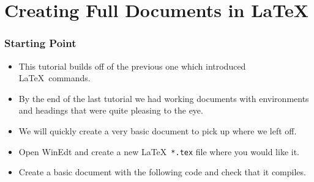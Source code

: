 \part{Creating Full Documents in \LaTeX}
\section{Starting Point}
\begin{itemize}
\item This tutorial builds off of the previous one which introduced
  \LaTeX~commands.
\item By the end of the last tutorial we had working documents with
  environments and headings that were quite pleasing to the eye.
\item We will quickly create a very basic document to pick up where we
  left off.
\item Open WinEdt and create a new \LaTeX~\texttt{*.tex} file where
  you would like it.
\item Create a basic document with the following code and check that
  it compiles.
  
\end{itemize}

